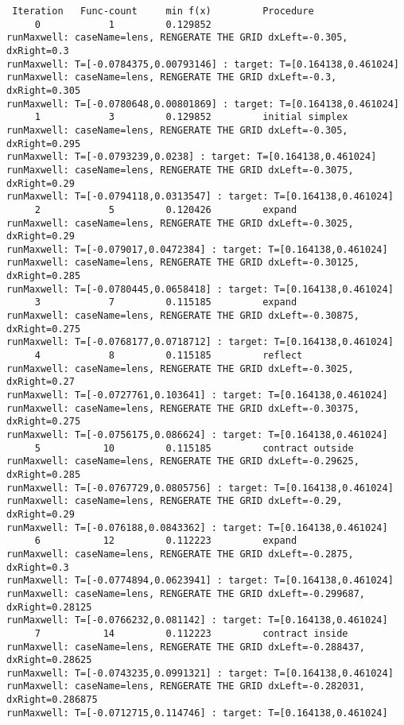 \documentclass[11pt]{article}
\begin{document}
{\begin{verbatim}
 Iteration   Func-count     min f(x)         Procedure
     0            1         0.129852         
runMaxwell: caseName=lens, RENGERATE THE GRID dxLeft=-0.305, dxRight=0.3
runMaxwell: T=[-0.0784375,0.00793146] : target: T=[0.164138,0.461024]
runMaxwell: caseName=lens, RENGERATE THE GRID dxLeft=-0.3, dxRight=0.305
runMaxwell: T=[-0.0780648,0.00801869] : target: T=[0.164138,0.461024]
     1            3         0.129852         initial simplex
runMaxwell: caseName=lens, RENGERATE THE GRID dxLeft=-0.305, dxRight=0.295
runMaxwell: T=[-0.0793239,0.0238] : target: T=[0.164138,0.461024]
runMaxwell: caseName=lens, RENGERATE THE GRID dxLeft=-0.3075, dxRight=0.29
runMaxwell: T=[-0.0794118,0.0313547] : target: T=[0.164138,0.461024]
     2            5         0.120426         expand
runMaxwell: caseName=lens, RENGERATE THE GRID dxLeft=-0.3025, dxRight=0.29
runMaxwell: T=[-0.079017,0.0472384] : target: T=[0.164138,0.461024]
runMaxwell: caseName=lens, RENGERATE THE GRID dxLeft=-0.30125, dxRight=0.285
runMaxwell: T=[-0.0780445,0.0658418] : target: T=[0.164138,0.461024]
     3            7         0.115185         expand
runMaxwell: caseName=lens, RENGERATE THE GRID dxLeft=-0.30875, dxRight=0.275
runMaxwell: T=[-0.0768177,0.0718712] : target: T=[0.164138,0.461024]
     4            8         0.115185         reflect
runMaxwell: caseName=lens, RENGERATE THE GRID dxLeft=-0.3025, dxRight=0.27
runMaxwell: T=[-0.0727761,0.103641] : target: T=[0.164138,0.461024]
runMaxwell: caseName=lens, RENGERATE THE GRID dxLeft=-0.30375, dxRight=0.275
runMaxwell: T=[-0.0756175,0.086624] : target: T=[0.164138,0.461024]
     5           10         0.115185         contract outside
runMaxwell: caseName=lens, RENGERATE THE GRID dxLeft=-0.29625, dxRight=0.285
runMaxwell: T=[-0.0767729,0.0805756] : target: T=[0.164138,0.461024]
runMaxwell: caseName=lens, RENGERATE THE GRID dxLeft=-0.29, dxRight=0.29
runMaxwell: T=[-0.076188,0.0843362] : target: T=[0.164138,0.461024]
     6           12         0.112223         expand
runMaxwell: caseName=lens, RENGERATE THE GRID dxLeft=-0.2875, dxRight=0.3
runMaxwell: T=[-0.0774894,0.0623941] : target: T=[0.164138,0.461024]
runMaxwell: caseName=lens, RENGERATE THE GRID dxLeft=-0.299687, dxRight=0.28125
runMaxwell: T=[-0.0766232,0.081142] : target: T=[0.164138,0.461024]
     7           14         0.112223         contract inside
runMaxwell: caseName=lens, RENGERATE THE GRID dxLeft=-0.288437, dxRight=0.28625
runMaxwell: T=[-0.0743235,0.0991321] : target: T=[0.164138,0.461024]
runMaxwell: caseName=lens, RENGERATE THE GRID dxLeft=-0.282031, dxRight=0.286875
runMaxwell: T=[-0.0712715,0.114746] : target: T=[0.164138,0.461024]

\end{verbatim}}
\end{document}
